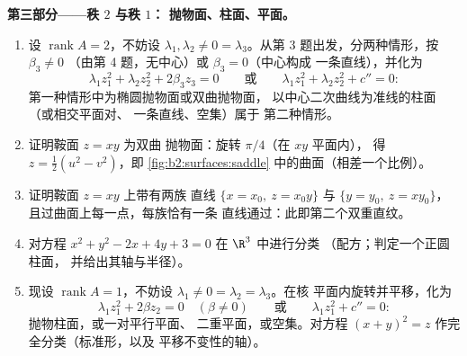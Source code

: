 \begin{problem}
\medskip
\noindent\textbf{第三部分——秩 $2$ 与秩 $1$：
抛物面、柱面、平面。}
\begin{enumerate}[resume]
  \item 设 $\operatorname{rank}A = 2$，不妨设 $\lambda_1,
        \lambda_2 \neq 0 = \lambda_3$。从第
        3 题出发，分两种情形，按 $\beta_3 \neq 0$
        （由第 4 题，无中心）或 $\beta_3 = 0$（中心构成
        一条直线），并化为
        \[
        \lambda_1z_1^2 + \lambda_2z_2^2 + 2\beta_3z_3 = 0
        \qquad\text{或}\qquad
        \lambda_1z_1^2 + \lambda_2z_2^2 + c'' = 0 :
        \]
        第一种情形中为椭圆抛物面或双曲抛物面，
        以中心二次曲线为准线的柱面（或相交平面对、
        一条直线、空集）属于
        第二种情形。
  \item 证明鞍面 $z = xy$ 为双曲
        抛物面：旋转 $\pi/4$（在 $xy$ 平面内），
        得 $z = \tfrac12(u^2 - v^2)$，即
        \cref{fig:b2:surfaces:saddle} 中的曲面（相差一个比例）。
  \item 证明鞍面 $z = xy$ 上带有两族
        直线 $\{x = x_0,\ z = x_0y\}$ 与 $\{y = y_0,\ z
        = xy_0\}$，且过曲面上每一点，每族恰有一条
        直线通过：此即第二个双重直纹。
  \item 对方程 $x^2 + y^2 - 2x + 4y + 3 = 0$ 在 $\R^3$ 中进行分类
        （配方；判定一个正圆柱面，
        并给出其轴与半径）。
  \item 现设 $\operatorname{rank}A = 1$，不妨设 $\lambda_1
        \neq 0 = \lambda_2 = \lambda_3$。在核
        平面内旋转并平移，化为
        \[
        \lambda_1z_1^2 + 2\beta z_2 = 0 \quad (\beta \neq 0)
        \qquad\text{或}\qquad
        \lambda_1z_1^2 + c'' = 0 :
        \]
        抛物柱面，或一对平行平面、
        二重平面，或空集。对方程 $(x + y)^2 =
        z$ 作完全分类（标准形，以及
        平移不变性的轴）。
\end{enumerate}


\end{problem}
